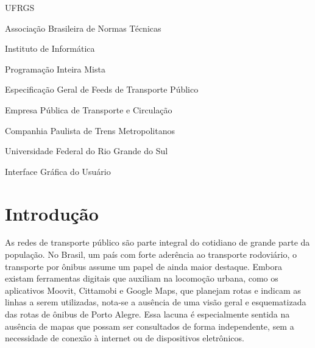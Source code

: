 \documentclass[cic,tc]{infufrgs}
\begin{document}
\tableofcontents

\listoffigures

\listoftables

\begin{listofabbrv}{UFRGS}
  \item[ABNT] Associação Brasileira de Normas Técnicas
  \item[INF]  Instituto de Informática
  \item[MIP] Programação Inteira Mista
  \item[GTFS] Especificação Geral de Feeds de Transporte Público
  \item[EPTC] Empresa Pública de Transporte e Circulação
  \item[CPTM] Companhia Paulista de Trens Metropolitanos
  \item[UFRGS] Universidade Federal do Rio Grande do Sul
  \item[GUI] Interface Gráfica do Usuário
\end{listofabbrv}



\chapter{Introdução}

As redes de transporte público são parte integral do cotidiano de grande parte da população. No Brasil, um país com forte aderência ao transporte rodoviário, o transporte por ônibus assume um papel de ainda maior destaque. Embora existam ferramentas digitais que auxiliam na locomoção urbana, como os aplicativos Moovit, Cittamobi e Google Maps, que planejam rotas e indicam as linhas a serem utilizadas, nota-se a ausência de uma visão geral e esquematizada das rotas de ônibus de Porto Alegre. Essa lacuna é especialmente sentida na ausência de mapas que possam ser consultados de forma independente, sem a necessidade de conexão à internet ou de dispositivos eletrônicos.
\end{document}
